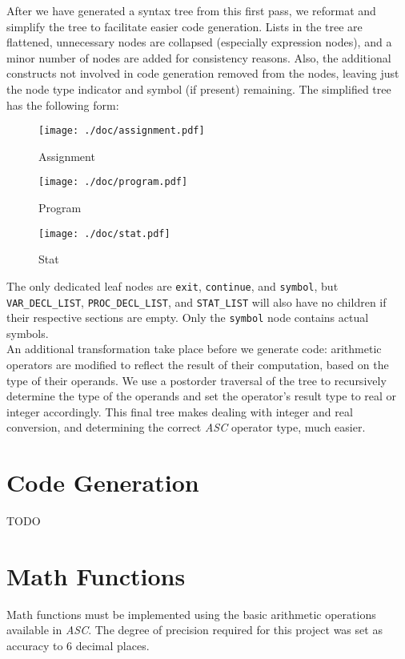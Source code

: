 \documentclass{report}
\begin{document}
After we have generated a syntax tree from this first pass, we reformat and simplify the tree to facilitate easier code generation. Lists in the tree are flattened, unnecessary nodes are collapsed (especially expression nodes), and a minor number of nodes are added for consistency reasons. Also, the additional constructs not involved in code generation removed from the nodes, leaving just the node type indicator and symbol (if present) remaining. The simplified tree has the following form:\\

\begin{figure}[ht]
\caption{Assignment}
\centering
\texttt{[image: ./doc/assignment.pdf]}
\end{figure}

\begin{figure}[ht]
\caption{Program}
\centering
\texttt{[image: ./doc/program.pdf]}
\end{figure}

\begin{figure}[ht]
\caption{Stat}
\centering
\texttt{[image: ./doc/stat.pdf]}\\
\end{figure}

The only dedicated leaf nodes are \texttt{exit}, \texttt{continue}, and \texttt{symbol}, but \texttt{VAR\_DECL\_LIST}, \texttt{PROC\_DECL\_LIST},  and \texttt{STAT\_LIST} will also have no children if their respective sections are empty. Only the \texttt{symbol} node contains actual symbols.\\

An additional transformation take place before we generate code: arithmetic operators are modified to reflect the result of their computation, based on the type of their operands. We use a postorder traversal of the tree to recursively determine the type of the operands and set the operator's result type to real or integer accordingly. This final tree makes dealing with integer and real conversion, and determining the correct \emph{ASC} operator type, much easier.


\section*{Code Generation}
TODO\\

\section*{Math Functions}
Math functions must be implemented using the basic arithmetic operations available in \emph{ASC}. The degree of precision required for this project was set as accuracy to 6 decimal places.
\end{document}
